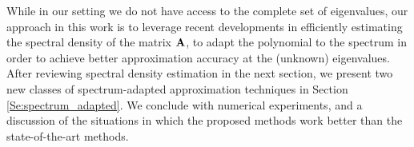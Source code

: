 \documentclass{article}
\begin{document}
While in our setting we do not have access to the complete set of eigenvalues, our approach in this work is to leverage recent developments in efficiently estimating the spectral density of the matrix ${\bf A}$, to adapt the polynomial to the spectrum in order to achieve better approximation accuracy at the (unknown) eigenvalues. After reviewing spectral density estimation in the next section, we present two new classes of spectrum-adapted approximation techniques in Section \ref{Se:spectrum_adapted}. We conclude with numerical experiments, and a discussion of the situations in which the proposed methods work better than the state-of-the-art methods.

\end{document}
